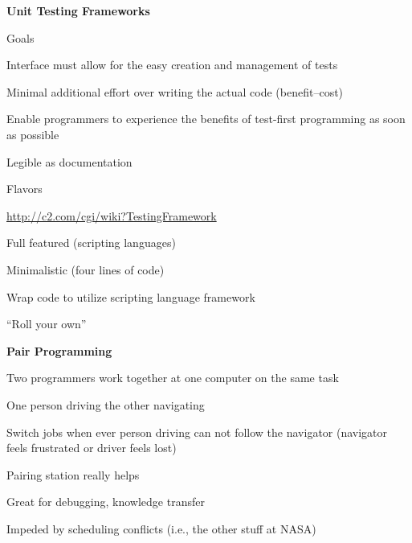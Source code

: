 \documentclass[landscape]{slides}
\renewcommand{\title}[1]{{\large\bfseries #1}}
\newenvironment{itemiz}%
  {\begin{list}{}{\raggedright
      \setlength{\itemsep}{2pt}%
      \setlength{\parskip}{4pt}\setlength{\parsep}{2pt}}}%
  {\end{list}}%
\begin{document}
 \begin{slide}
   \title{Unit Testing Frameworks}
   \begin{itemiz}
   \item Goals
     \begin{itemiz}
     \item Interface must allow for the easy creation and management of tests
     \item Minimal additional effort over writing the actual code
     (benefit--cost)
     \item Enable programmers to experience the benefits of test-first
       programming as soon as possible
     \item Legible as documentation
     \end{itemiz}
   \item Flavors
     \begin{itemiz}
     \item \url{http://c2.com/cgi/wiki?TestingFramework}
     \item Full featured (scripting languages)
     \item Minimalistic (four lines of code)
     \item Wrap code to utilize scripting language framework
     \item ``Roll your own''
     \end{itemiz}
   \end{itemiz}
 \end{slide}
 
 \begin{slide}
   \title{Pair Programming}
   \begin{itemiz}
   \item Two programmers work together at one computer on the same
     task
     \begin{itemiz}
     \item One person driving the other navigating
     \item Switch jobs when ever person driving can not follow the navigator
       (navigator feels frustrated or driver feels lost)
     \end{itemiz}
   \item Pairing station really helps
   \item Great for debugging, knowledge transfer
   \item Impeded by scheduling conflicts (i.e., the other stuff at NASA)
   \end{itemiz}
 \end{slide}
 
\end{document}
